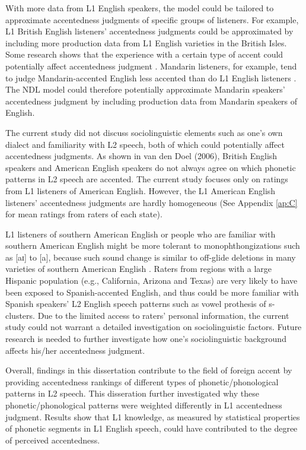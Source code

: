 With more data from L1 English speakers, the model could be tailored to approximate accentedness judgments of specific groups of listeners. For example, L1 British English listeners' accentedness judgments could be approximated by including more production data from L1 English varieties in the British Isles. Some research shows that the experience with a certain type of accent could potentially affect accentedness judgment \citep{wester_2014}. Mandarin listeners, for example, tend to judge Mandarin-accented English less accented than do L1 English listeners \citep{wester_2014}. The NDL model could therefore potentially approximate Mandarin speakers' accentedness judgment by including production data from Mandarin speakers of English.

The current study did not discuss sociolinguistic elements such as one’s own dialect and familiarity with L2 speech, both of which could potentially affect accentedness judgments. As shown in van den Doel (2006), British English speakers and American English speakers do not always agree on which phonetic patterns in L2 speech are accented. The current study focuses only on ratings from L1 listeners of American English. However, the L1 American English listeners' accentedness judgments are hardly homogeneous (See Appendix \ref{ap:C} for mean ratings from raters of each state). 

L1 listeners of southern American English or people who are familiar with southern American English might be more tolerant to monophthongizations such as [aɪ] to [a], because such sound change is similar to off-glide deletions in many varieties of southern American English \citep{Labov_2005}. Raters from regions with a large Hispanic population (e.g., California, Arizona and Texas) are very likely to have been exposed to Spanish-accented English, and thus could be more familiar with Spanish speakers’ L2 English speech patterns such as vowel prothesis of s-clusters. Due to the limited access to raters’ personal information, the current study could not warrant a detailed investigation on sociolinguistic factors. Future research is needed to further investigate how one’s sociolinguistic background affects his/her accentedness judgment. 

Overall, findings in this dissertation contribute to the field of foreign accent by providing accentedness rankings of different types of phonetic/phonological patterns in L2 speech. This disseration further investigated why these phonetic/phonological patterns were weighted differently in L1 accentedness judgment. Results show that L1 knowledge, as measured by statistical properties of phonetic segments in L1 English speech, could have contributed to the degree of perceived accentedness.